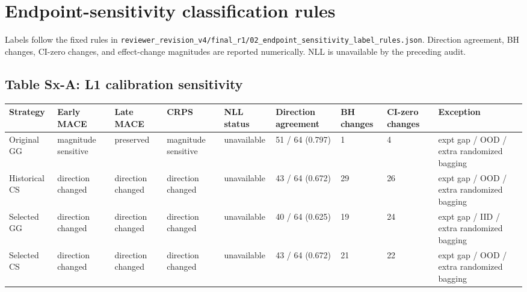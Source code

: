 \documentclass[9pt]{article}
\begin{document}
\section{Endpoint-sensitivity classification rules}
Labels follow the fixed rules in
\texttt{reviewer\_revision\_v4/final\_r1/02\_endpoint\_sensitivity\_label\_rules.json}.
Direction agreement, BH changes, CI-zero changes, and effect-change magnitudes
are reported numerically. NLL is unavailable by the preceding audit.

\begin{landscape}
\section{Table Sx-A: L1 calibration sensitivity}
{\fontsize{8}{9.6}\selectfont
\begin{tabularx}{\linewidth}{lYYYYYYYY}
\toprule
Strategy & Early MACE & Late MACE & CRPS & NLL status & Direction agreement & BH changes & CI-zero changes & Exception\\
\midrule
Original GG & magnitude sensitive & preserved & magnitude sensitive & unavailable & 51 / 64 (0.797) & 1 & 4 & expt gap / OOD / extra randomized bagging\\
Historical CS & direction changed & direction changed & direction changed & unavailable & 43 / 64 (0.672) & 29 & 26 & expt gap / OOD / extra randomized bagging\\
Selected GG & direction changed & direction changed & direction changed & unavailable & 40 / 64 (0.625) & 19 & 24 & expt gap / IID / extra randomized bagging\\
Selected CS & direction changed & direction changed & direction changed & unavailable & 43 / 64 (0.672) & 21 & 22 & expt gap / OOD / extra randomized bagging\\
\bottomrule
\end{tabularx}}


\end{landscape}
\end{document}
